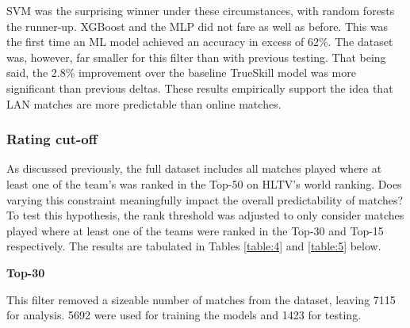 SVM was the surprising winner under these circumstances, with random forests the runner-up. XGBoost and the MLP did not fare as well as before. This was the first time an ML model achieved an accuracy in excess of 62\%. The dataset was, however, far smaller for this filter than with previous testing. That being said, the 2.8\% improvement over the baseline TrueSkill model was more significant than previous deltas. These results empirically support the idea that LAN matches are more predictable than online matches.


\subsubsection{Rating cut-off}

As discussed previously, the full dataset includes all matches played where at least one of the team's was ranked in the Top-50 on HLTV's world ranking. Does varying this constraint meaningfully impact the overall predictability of matches? To test this hypothesis, the rank threshold was adjusted to only consider matches played where at least one of the teams were ranked in the Top-30 and Top-15 respectively. The results are tabulated in Tables \ref{table:4} and \ref{table:5} below.

\textbf{Top-30}

This filter removed a sizeable number of matches from the dataset, leaving 7115 for analysis. 5692 were used for training the models and 1423 for testing.


